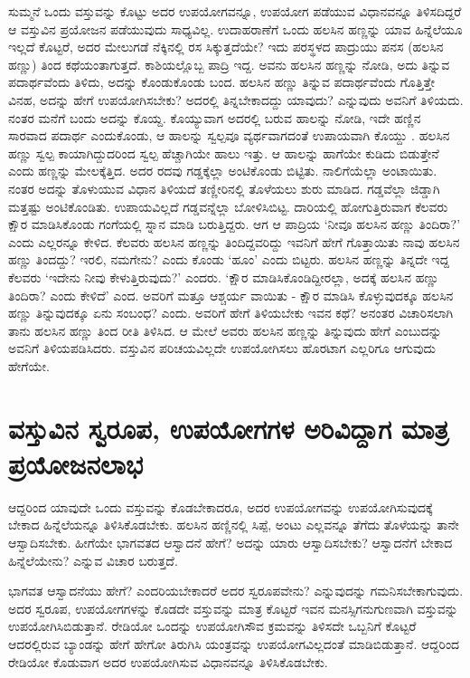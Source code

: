 ಸುಮ್ಮನೆ ಒಂದು ವಸ್ತುವನ್ನು ಕೊಟ್ಟು ಅದರ ಉಪಯೋಗವನ್ನೂ, ಉಪಯೋಗ ಪಡೆಯುವ ವಿಧಾನವನ್ನೂ ತಿಳಿಸದಿದ್ದರೆ ಆ ವಸ್ತುವಿನ ಪ್ರಯೋಜನ ಪಡೆಯುವುದು ಸಾಧ್ಯವಿಲ್ಲ. ಉದಾಹರಾಣೆಗೆ ಒಂದು ಹಲಸಿನ ಹಣ್ಣನ್ನು ಯಾವ ಹಿನ್ನೆಲೆಯೂ ಇಲ್ಲದೆ ಕೊಟ್ಟರೆ, ಅದರ ಮೇಲುಗಡೆ ನೆಕ್ಕಿನಲ್ಲಿ ರಸ ಸಿಕ್ಕುತ್ತದೆಯೇ? ಇದು ಪರಸ್ಥಳದ ಪಾದ್ರುಯು ಪನಸ (ಹಲಸಿನ ಹಣ್ಣು) ತಿಂದ ಕಥೆಯಂತಾಗುತ್ತದೆ. ಕಾಶಿಯಲ್ಲೊಬ್ಬ ಪಾದ್ರಿ ಇದ್ದ. ಅವನು ಹಲಸಿನ ಹಣ್ಣನ್ನು ನೋಡಿ, ಅದು ತಿನ್ನುವ ಪದಾರ್ಥವೆಂದು ತಿಳಿದು, ಅದನ್ನು ಕೊಂಡುಕೊಂಡು ಬಂದ. ಹಲಸಿನ ಹಣ್ಣು ತಿನ್ನುವ ಪದಾರ್ಥವೆಂದು ಗೊತ್ತಿತ್ತೇ ವಿನಹ, ಅದನ್ನು ಹೇಗೆ ಉಪಯೋಗಿಸಬೇಕು? ಅದರಲ್ಲಿ ತಿನ್ನಬೇಕಾದದ್ದು ಯಾವುದು? ಎನ್ನುವುದು ಅವನಿಗೆ ತಿಳಿಯದು. ನಂತರ ಮನೆಗೆ ಬಂದು ಅದನ್ನು ಕೊಯ್ದ. ಕೊಯ್ಯುವಾಗ ಅದರಲ್ಲಿ ಬರುವ ಹಾಲನ್ನು ನೋಡಿ, ಇದೇ ಹಣ್ಣಿನ ಸಾರವಾದ ಪದಾರ್ಥ ಎಂದುಕೊಂಡು, ಆ ಹಾಲನ್ನು ಸ್ವಲ್ಪವೂ ವ್ಯರ್ಥವಾಗದಂತೆ ಉಪಾಯವಾಗಿ ಕೊಯ್ದು . ಹಲಸಿನ ಹಣ್ಣು ಸ್ವಲ್ಪ ಕಾಯಾಗಿದ್ದುದರಿಂದ ಸ್ವಲ್ಪ ಹೆಚ್ಚಾಗಿಯೇ ಹಾಲು ಇತ್ತು. ಆ ಹಾಲನ್ನು ಹಾಗೆಯೇ ಕುಡಿದು ಬಿಡುತ್ತೇನೆ ಎಂದು ಹಣ್ಣನ್ನು ಮೇಲಕ್ಕೆತ್ತಿದ. ಅದರ ರದವು ಗಡ್ಡಕ್ಕೆಲ್ಲಾ ಅಂಟಿಕೊಂಡು ಬಿಟ್ಟಿತು. ನಾಲಿಗೆಯೆಲ್ಲಾ ಅಂಟಾಯಿತು. ನಂತರ ಅದನ್ನು ತೊಳುಯುವ ವಿಧಾನ ತಿಳಿಯದೆ ತಣ್ಣೀರಿನಲ್ಲಿ ತೊಳೆಯಲು ಶುರು ಮಾಡಿದ. ಗಡ್ಡವೆಲ್ಲಾ ಜಿಡ್ಡಾಗಿ ಮತ್ತಷ್ಟು ಅಂಟಿಕೊಂಡಿತು. ಉಪಾಯವಿಲ್ಲದೆ ಗಡ್ಡವನ್ನೆಲ್ಲಾ ಬೋಳಿಸಿಬಿಟ್ಟ. ದಾರಿಯಲ್ಲಿ ಹೋಗುತ್ತಿರುವಾಗ ಕೆಲವರು ಕ್ಷೌರ ಮಾಡಿಸಿಕೊಂಡು ಗಂಗೆಯಲ್ಲಿ ಸ್ನಾನ ಮಾಡಿ ಬರುತ್ತಿದ್ದರು. ಆಗ ಆ ಪಾದ್ರಿಯ `ನೀವೂ ಹಲಸಿನ ಹಣ್ಣು ತಿಂದಿರಾ?' ಎಂದು ಎಲ್ಲರನ್ನೂ ಕೇಳಿದ. ಕೆಲವರು ಹಲಸಿನ ಹಣ್ಣನ್ನು ತಿಂದಿದ್ದವರಿದ್ದು ಇವನಿಗೆ ಹೇಗೆ ಗೊತ್ತಾಯಿತು ನಾವು ಹಲಸಿನ ಹಣ್ಣು ತಿಂದದ್ದು? ಇರಲಿ, ನಮಗೇನು? ಎಂದು ಕೊಂಡು `ಹೂಂ' ಎಂದು ಬಿಟ್ಟರು. ಹಲಸಿನ ಹಣ್ಣನ್ನು ತಿನ್ನದೇ ಇದ್ದ ಕೆಲವರು `ಇದೇನು ನೀವು ಕೇಳುತ್ತಿರುವುದು?' ಎಂದರು. `ಕ್ಷೌರ ಮಾಡಿಸಿಕೊಂಡಿದ್ದೀರಲ್ಲಾ, ಅದಕ್ಕೆ ಹಲಸಿನ ಹಣ್ಣು ತಿಂದಿರಾ? ಎಂದು ಕೇಳಿದೆ' ಎಂದ. ಅವರಿಗೆ ಮತ್ತೂ ಆಶ್ಚರ್ಯ ವಾಯಿತು - ಕ್ಷೌರ ಮಾಡಿಸಿ ಕೊಳ್ಳುವುದಕ್ಕೂ ಹಲಸಿನ ಹಣ್ಣು ತಿನ್ನುವುದಕ್ಕೂ ಏನು ಸಂಬಂಧ? ಎಂದು. ಅವರಿಗೆ ಹೇಗೆ ತಿಳಿಯಬೇಕು ಇವನ ಕಥೆ? ಅನಂತರ ವಿಚಾರಿಸಲಾಗಿ ತಾನು ಹಲಸಿನ ಹಣ್ಣು ತಿಂದ ರೀತಿ ತಿಳಿಸಿದ. ಆ ಮೇಲೆ ಅವರು ಹಲಸಿನ ಹಣ್ಣನ್ನು ತಿನ್ನುವುದು ಹೇಗೆ ಎಂಬುದನ್ನು ಅವನಿಗೆ ತಿಳಿಯಪಡಿಸಿದರು. ವಸ್ತುವಿನ ಪರಿಚಯವಿಲ್ಲದೇ ಉಪಯೋಗಿಸಲು ಹೊರಟಾಗ ಎಲ್ಲರಿಗೂ ಆಗುವುದು ಹೇಗೆಯೇ.


\section*{ವಸ್ತುವಿನ ಸ್ವರೂಪ, ಉಪಯೋಗಗಳ ಅರಿವಿದ್ದಾಗ ಮಾತ್ರ  ಪ್ರಯೋಜನಲಾಭ}

ಆದ್ದರಿಂದ ಯಾವುದೇ ಒಂದು ವಸ್ತುವನ್ನು ಕೊಡಬೇಕಾದರೂ, ಅದರ ಉಪಯೋಗವನ್ನು ಉಪಯೋಗಿಸುವುದಕ್ಕೆ ಬೇಕಾದ ಹಿನ್ನೆಲೆಯನ್ನೂ ತಿಳಿಸಿಕೊಡಬೇಕು. ಹಲಸಿನ ಹಣ್ಣಿನಲ್ಲಿ ಸಿಪ್ಪೆ, ಅಂಟು ಎಲ್ಲವನ್ನೂ ತೆಗೆದು ತೊಳೆಯನ್ನು ತಾನೇ ಆಸ್ವಾದಿಸಬೇಕು. ಹೀಗೆಯೇ ಭಾಗವತದ ಆಸ್ವಾದನೆ ಹೇಗೆ? ಅದನ್ನು ಯಾರು ಆಸ್ವಾದಿಸಬೇಕು? ಆಸ್ವಾದನೆಗೆ ಬೇಕಾದ ಹಿನ್ನೆಲೆಯೇನು? ಎನ್ನುವ ವಿಚಾರ ಬರುತ್ತದೆ. 

ಭಾಗವತ ಆಸ್ವಾದನೆಯು ಹೇಗೆ? ಎಂದರಿಯಬೇಕಾದರೆ ಅದರ ಸ್ವರೂಪವೇನು? ಎನ್ನುವುದನ್ನು ಗಮನಿಸಬೇಕಾಗುವುದು. ಅದರ ಸ್ವರೂಪ, ಉಪಯೋಗಗಳನ್ನು ಕೊಡದೇ ವಸ್ತುವನ್ನು ಮಾತ್ರ ಕೊಟ್ಟರೆ ಇವನ ಮನಸ್ಸಿಗನುಗುಣವಾಗಿ ವಸ್ತುವನ್ನು ಉಪಯೋಗಿಸಿಬಿಡುತ್ತಾನೆ. ರೇಡಿಯೋ ಒಂದನ್ನು ಉಪಯೋಗಿಸೌವ ಕ್ರಮವನ್ನು ತಿಳಿಸದೇ ಒಬ್ಬನಿಗೆ ಕೊಟ್ಟರೆ ಆದರಲ್ಲಿರುವ ಬ್ಯಾಂಡನ್ನು ಹೇಗೆ ಹೇಗೋ ತಿರುಗಿಸಿ ಯಂತ್ರವನ್ನು ಉಪಯೋಗವಿಲ್ಲದಂತೆ ಮಾಡಿಬಿಡುತ್ತಾನೆ. ಆದ್ದರಿಂದ ರೇಡಿಯೋ ಕೊಡುವಾಗ ಅದರ ಉಪಯೋಗಿಸುವ ವಿಧಾನವನ್ನೂ ತಿಳಿಸಿಕೊಡಬೇಕು. 

